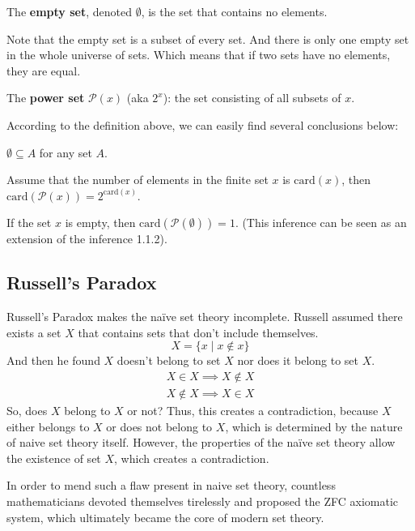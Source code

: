 \documentclass[oneside]{book}
\begin{document}
\begin{definition}
The \textbf{empty set}, denoted $\emptyset$, is the set that contains no elements.
\end{definition}

Note that the empty set is a subset of every set. And there is only one empty set in the whole universe of sets. Which means that if two sets have no elements, they are equal.

\begin{definition}
The \textbf{power set} $\mathcal{P}(x)$ (aka $2^{x}$): the set consisting of all subsets of $x$.
\end{definition}

According to the definition above, we can easily find several conclusions below:
\begin{inference}
$\emptyset \subseteq A$ for any set $A$.
\end{inference}
\begin{inference}
Assume that the number of elements in the finite set $x$ is $\text{card}(x)$, then $\text{card}(\mathcal{P}(x)) = 2^{\text{card}(x)}$.
\end{inference}
\begin{inference}
If the set $x$ is empty, then $\text{card}(\mathcal{P}(\emptyset)) = 1$. (This inference can be seen as an extension of the inference 1.1.2).
\end{inference}

\subsection*{Russell’s Paradox}
Russell’s Paradox makes the naïve set theory incomplete. Russell assumed there exists a set $X$ that contains sets that don’t include themselves.
$$ X = \{ x \mid x \notin x \} $$
And then he found $X$ doesn't belong to set $X$ nor does it belong to set $X$.
\begin{align*}
    X \in X \implies X \notin X \\
    X \notin X \implies X \in X
\end{align*}
So, does $X$ belong to $X$ or not? Thus, this creates a contradiction, because $X$ either belongs to $X$ or does not belong to $X$, which is determined by the nature of naive set theory itself. However, the properties of the naïve set theory allow the existence of set $X$, which creates a contradiction.

In order to mend such a flaw present in naive set theory, countless mathematicians devoted themselves tirelessly and proposed the ZFC axiomatic system, which ultimately became the core of modern set theory.
\end{document}
